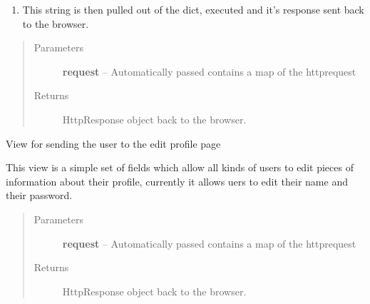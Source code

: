 \documentclass[letterpaper,10pt,english]{sphinxmanual}
\begin{document}
\begin{fulllineitems}
\begin{enumerate}
\item {} 
This string is then pulled out of the dict, executed and it's response
sent back to the browser.

\end{enumerate}
\begin{quote}\begin{description}
\item[{Parameters}] \leavevmode
\textbf{request} -- Automatically passed contains a map of the httprequest

\item[{Returns}] \leavevmode
HttpResponse object back to the browser.

\end{description}\end{quote}

\end{fulllineitems}


\begin{fulllineitems}
\label{code:timetracker.views.edit_profile}
View for sending the user to the edit profile page

This view is a simple set of fields which allow all kinds of users to edit
pieces of information about their profile, currently it allows uers to
edit their name and their password.
\begin{quote}\begin{description}
\item[{Parameters}] \leavevmode
\textbf{request} -- Automatically passed contains a map of the httprequest

\item[{Returns}] \leavevmode
HttpResponse object back to the browser.

\end{description}\end{quote}

\end{fulllineitems}

\end{document}

